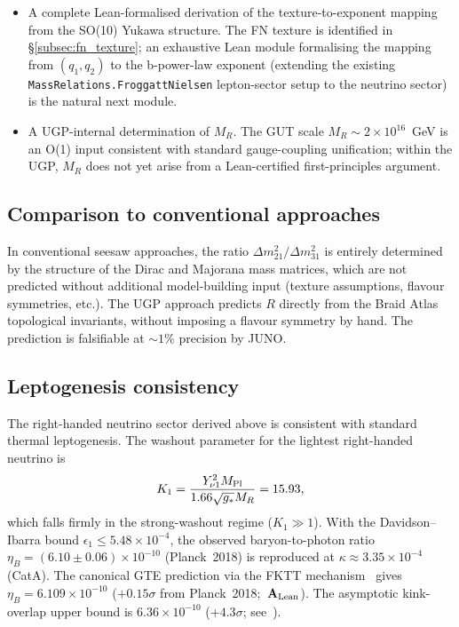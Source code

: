 \documentclass[12pt,a4paper]{article}
\theoremstyle{definition}
\theoremstyle{remark}
\newcommand{\CatAL}{\ensuremath{\textbf{A}_{\rm Lean}}}
\begin{document}
\begin{itemize}[leftmargin=1.3em,itemsep=0.15em]
  \item A complete Lean-formalised derivation of the texture-to-exponent
    mapping from the SO(10) Yukawa structure.  The FN texture is identified
    in \S\ref{subsec:fn_texture}; an exhaustive Lean module formalising the
    mapping from $(q_1, q_2)$ to the b-power-law exponent (extending the
    existing \texttt{MassRelations.FroggattNielsen} lepton-sector setup to the
    neutrino sector) is the natural next module.
  \item A UGP-internal determination of $M_R$.  The GUT scale
    $M_R \sim 2\times 10^{16}$~GeV is an O(1) input consistent with
    standard gauge-coupling unification; within the UGP, $M_R$ does
    not yet arise from a Lean-certified first-principles argument.
\end{itemize}

\subsection{Comparison to conventional approaches}
\label{subsec:comparison}

In conventional seesaw approaches, the ratio $\Delta m^2_{21}/\Delta m^2_{31}$
is entirely determined by the structure of the Dirac and Majorana
mass matrices, which are not predicted without additional
model-building input (texture assumptions, flavour symmetries, etc.).
The UGP approach predicts $R$ directly from the Braid Atlas topological
invariants, without imposing a flavour symmetry by hand.
The prediction is falsifiable at $\sim 1\%$ precision by JUNO.

\subsection{Leptogenesis consistency}
\label{subsec:leptogenesis}

The right-handed neutrino sector derived above is consistent with standard thermal
leptogenesis.  The washout parameter for the lightest right-handed neutrino is
\[
  K_1 = \frac{Y_{\nu 1}^2 M_{\rm Pl}}{1.66\sqrt{g_*} M_R} = 15.93,
\]
which falls firmly in the strong-washout regime ($K_1 \gg 1$).
With the Davidson--Ibarra bound $\epsilon_1 \leq 5.48\times10^{-4}$, the observed
baryon-to-photon ratio $\eta_B = (6.10\pm0.06)\times10^{-10}$ (Planck~2018) is reproduced at
$\kappa \approx 3.35\times10^{-4}$ (CatA).
The canonical GTE prediction via the FKTT mechanism~\cite{SpivackGTECosmology} gives
$\eta_B = 6.109\times10^{-10}$ ($+0.15\sigma$ from Planck~2018;~\CatAL).
The asymptotic kink-overlap upper bound is $6.36\times10^{-10}$ ($+4.3\sigma$; see~\cite{SpivackGTECosmology}).
\end{document}
